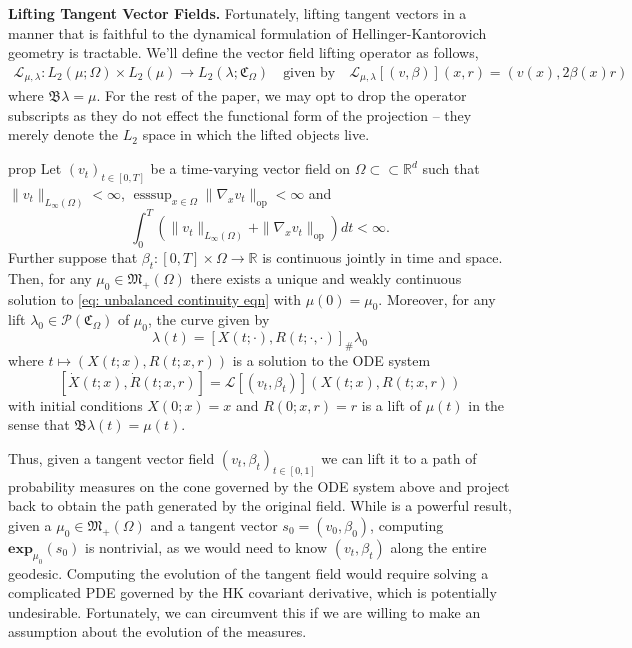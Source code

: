 \documentclass[11pt]{article}
\DeclareMathOperator{\esssup}{esssup}
\begin{document}
\noindent \textbf{Lifting Tangent Vector Fields.} Fortunately, lifting tangent vectors in a manner that is faithful to the dynamical formulation of Hellinger-Kantorovich geometry is tractable. We'll define the vector field lifting operator as follows, 
\begin{align*}
    \mathcal{L}_{\mu, \lambda}: L_2(\mu; \Omega) \times L_2(\mu) \rightarrow L_2(\lambda; \mathfrak{C}_\Omega) \quad \text{given by} \quad \mathcal{L}_{\mu, \lambda}[(v, \beta)](x,r) = (v(x), 2\beta(x)r)
\end{align*}
where $\mathfrak{B}\lambda = \mu$. For the rest of the paper, we may opt to drop the operator subscripts as they do not effect the functional form of the projection -- they merely denote the $L_2$ space in which the lifted objects live. 
\begin{restatable}{prop}{} \label{lifting velocities}
    Let $(v_t)_{t \in [0, T]}$ be a time-varying vector field on $\Omega \subset \subset \mathbb{R}^d$ such that $\|v_t\|_{L_\infty(\Omega)} < \infty$, $\esssup_{x \in \Omega}\|\nabla_xv_t\|_{\text{op}} < \infty$ and 
    \[\int_0^T \left(\|v_t\|_{L_\infty(\Omega)} + \|\nabla_xv_t\|_{\text{op}}\right)dt < \infty.\]
    Further suppose that $\beta_t: [0, T] \times \Omega \rightarrow \mathbb{R}$ is continuous jointly in time and space. Then, for any $\mu_0 \in \mathfrak{M}_+(\Omega)$ there exists a unique and weakly continuous solution to \cref{eq: unbalanced continuity eqn} with $\mu(0) = \mu_0$. Moreover, for any lift $\lambda_0 \in \mathcal{P}(\mathfrak{C}_\Omega)$ of $\mu_0$, the curve given by 
    \[\lambda(t) = \left[X(t; \cdot), R(t; \cdot, \cdot)\right]_{\#} \lambda_0\]
    where $t \mapsto \left(X(t;x), R(t; x, r)\right)$ is a solution to the ODE system
    \[[\dot X(t; x), \dot R(t; x, r)] = \mathcal{L}[(v_t, \beta_t)]\left(X(t; x), R(t; x, r)\right)\]
    with initial conditions $X(0; x) = x$ and $R(0; x, r) = r$ is a lift of $\mu(t)$ in the sense that $\mathfrak{B}\lambda(t) = \mu(t)$. 
\end{restatable}
\noindent Thus, given a tangent vector field $(v_t, \beta_t)_{t \in [0, 1]}$ we can lift it to a path of probability measures on the cone governed by the ODE system above and project back to obtain the path generated by the original field. While  is a powerful result, given a $\mu_0 \in \mathfrak{M}_+(\Omega)$ and a tangent vector $s_0 = (v_0, \beta_0)$, computing $\mathbf{exp}_{\mu_0}(s_0)$ is nontrivial, as we would need to know $(v_t, \beta_t)$ along the entire geodesic. Computing the evolution of the tangent field would require solving a complicated PDE governed by the HK covariant derivative, which is potentially undesirable. Fortunately, we can circumvent this if we are willing to make an assumption about the evolution of the measures.  
\end{document}
